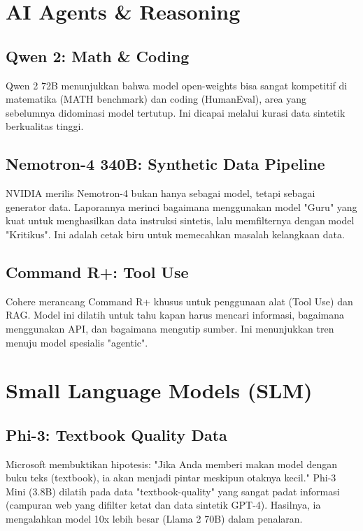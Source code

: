 \section{AI Agents \& Reasoning}

\subsection{Qwen 2: Math \& Coding \cite{qwen2024qwen2}}
Qwen 2 72B menunjukkan bahwa model open-weights bisa sangat kompetitif di matematika (MATH benchmark) dan coding (HumanEval), area yang sebelumnya didominasi model tertutup. Ini dicapai melalui kurasi data sintetik berkualitas tinggi.

\subsection{Nemotron-4 340B: Synthetic Data Pipeline \cite{apple2024nemotron}}
NVIDIA merilis Nemotron-4 bukan hanya sebagai model, tetapi sebagai generator data. Laporannya merinci bagaimana menggunakan model "Guru" yang kuat untuk menghasilkan data instruksi sintetis, lalu memfilternya dengan model "Kritikus". Ini adalah cetak biru untuk memecahkan masalah kelangkaan data.

\subsection{Command R+: Tool Use \cite{cohere2024commandr}}
Cohere merancang Command R+ khusus untuk penggunaan alat (Tool Use) dan RAG. Model ini dilatih untuk tahu kapan harus mencari informasi, bagaimana menggunakan API, dan bagaimana mengutip sumber. Ini menunjukkan tren menuju model spesialis "agentic".

\section{Small Language Models (SLM)}

\subsection{Phi-3: Textbook Quality Data \cite{microsoft2024phi3}}
Microsoft membuktikan hipotesis: "Jika Anda memberi makan model dengan buku teks (textbook), ia akan menjadi pintar meskipun otaknya kecil."
Phi-3 Mini (3.8B) dilatih pada data "textbook-quality" yang sangat padat informasi (campuran web yang difilter ketat dan data sintetik GPT-4). Hasilnya, ia mengalahkan model 10x lebih besar (Llama 2 70B) dalam penalaran.

